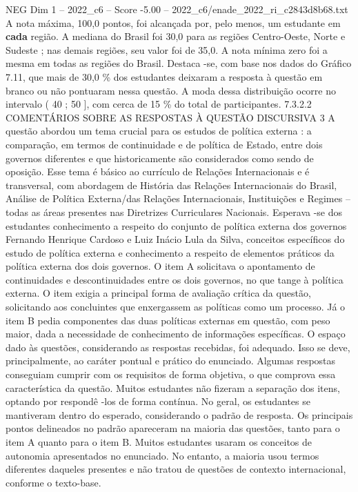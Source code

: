 \begin{textsample}{NEG Dim 1 – 2022\_c6 – Score -5.00 – 2022\_c6/enade\_2022\_ri\_c2843d8b68.txt}
A nota máxima, 100,0 pontos, foi alcançada por, pelo menos, um estudante em \textbf{cada} região.
A mediana do Brasil foi 30,0 para as regiões Centro-Oeste, Norte e Sudeste ; nas demais regiões, seu valor foi de 35,0.
A nota mínima zero foi a mesma em todas as regiões do Brasil.
Destaca -se, com base nos dados do Gráfico 7.11, que mais de 30,0 \% dos estudantes deixaram a resposta à questão em branco ou não pontuaram nessa questão.
A moda dessa distribuição ocorre no intervalo ( 40 ; 50 ], com cerca de 15 \% do total de participantes. 7.3.2.2 COMENTÁRIOS SOBRE AS RESPOSTAS À QUESTÃO DISCURSIVA 3 A questão abordou um tema crucial para os estudos de política externa : a comparação, em termos de continuidade e de política de Estado, entre dois governos diferentes e que historicamente são considerados como sendo de oposição.
Esse tema é básico ao currículo de Relações Internacionais e é transversal, com abordagem de História das Relações Internacionais do Brasil, Análise de Política Externa/das Relações Internacionais, Instituições e Regimes – todas as áreas presentes nas Diretrizes Curriculares Nacionais.
Esperava -se dos estudantes conhecimento a respeito do conjunto de política externa dos governos Fernando Henrique Cardoso e Luiz Inácio Lula da Silva, conceitos específicos do estudo de política externa e conhecimento a respeito de elementos práticos da política externa dos dois governos.
O item A solicitava o apontamento de continuidades e descontinuidades entre os dois governos, no que tange à política externa.
O item exigia a principal forma de avaliação crítica da questão, solicitando aos concluintes que enxergassem as políticas como um processo.
Já o item B pedia componentes das duas políticas externas em questão, com peso maior, dada a necessidade de conhecimento de informações específicas.
O espaço dado às questões, considerando as respostas recebidas, foi adequado.
Isso se deve, principalmente, ao caráter pontual e prático do enunciado.
Algumas respostas conseguiam cumprir com os requisitos de forma objetiva, o que comprova essa característica da questão.
Muitos estudantes não fizeram a separação dos itens, optando por respondê -los de forma contínua.
No geral, os estudantes se mantiveram dentro do esperado, considerando o padrão de resposta.
Os principais pontos delineados no padrão apareceram na maioria das questões, tanto para o item A quanto para o item B.
Muitos estudantes usaram os conceitos de autonomia apresentados no enunciado.
No entanto, a maioria usou termos diferentes daqueles presentes e não tratou de questões de contexto internacional, conforme o texto-base.

\end{textsample}
